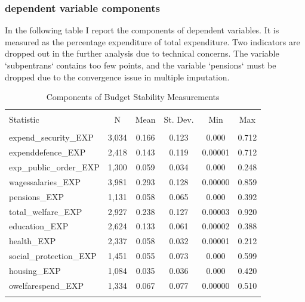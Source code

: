 \documentclass[12pt]{article}\usepackage[]{graphicx}\usepackage[]{color}
\begin{document}
\subsubsection{dependent variable components}

In the following table I report the components of dependent variables. It is measured as the percentage expenditure of total expenditure. Two indicators are dropped out in the further analysis due to technical concerns. The variable `subpentrans` contains too few points, and the variable `pensions` must be dropped due to the convergence issue in multiple imputation. 




\begin{table}[!htbp] \centering 
  \caption{Components of Budget Stability Measurements} 
  \label{comp} 
\begin{tabular}{@{\extracolsep{5pt}}lccccc} 
\\[-1.8ex]\hline 
\hline \\[-1.8ex] 
Statistic & \multicolumn{1}{c}{N} & \multicolumn{1}{c}{Mean} & \multicolumn{1}{c}{St. Dev.} & \multicolumn{1}{c}{Min} & \multicolumn{1}{c}{Max} \\ 
\hline \\[-1.8ex] 
expend\_security\_EXP & 3,034 & 0.166 & 0.123 & 0.000 & 0.712 \\ 
expenddefence\_EXP & 2,418 & 0.143 & 0.119 & 0.00001 & 0.712 \\ 
exp\_public\_order\_EXP & 1,300 & 0.059 & 0.034 & 0.000 & 0.248 \\ 
wagessalaries\_EXP & 3,981 & 0.293 & 0.128 & 0.00000 & 0.859 \\ 
pensions\_EXP & 1,131 & 0.058 & 0.065 & 0.000 & 0.392 \\ 
total\_welfare\_EXP & 2,927 & 0.238 & 0.127 & 0.00003 & 0.920 \\ 
education\_EXP & 2,624 & 0.133 & 0.061 & 0.00002 & 0.388 \\ 
health\_EXP & 2,337 & 0.058 & 0.032 & 0.00001 & 0.212 \\ 
social\_protection\_EXP & 1,451 & 0.055 & 0.073 & 0.000 & 0.599 \\ 
housing\_EXP & 1,084 & 0.035 & 0.036 & 0.000 & 0.420 \\ 
owelfarespend\_EXP & 1,334 & 0.067 & 0.077 & 0.00000 & 0.510 \\ 
\hline \\[-1.8ex] 
\end{tabular} 
\end{table} 
\end{document}
